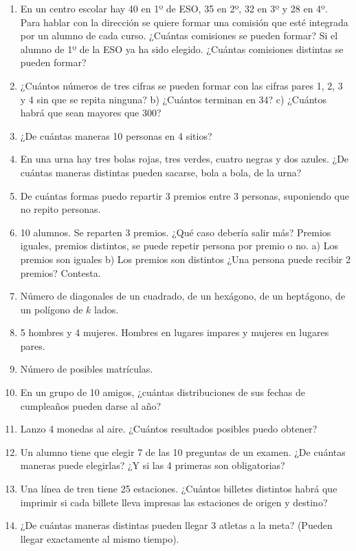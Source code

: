 \begin{enumerate}
	\item En un centro escolar hay 40 en 1º de ESO, 35 en 2º, 32 en 3º y 28 en 4º. Para hablar con la dirección se quiere formar una comisión que esté integrada por un alumno de cada curso. ¿Cuántas comisiones se pueden formar?
	\subitem Si el alumno de 1º de la ESO ya ha sido elegido. ¿Cuántas comisiones distintas se pueden formar?
	\item ¿Cuántos números de tres cifras se pueden formar con las cifras pares 1, 2, 3 y 4 sin que se repita ninguna? b) ¿Cuántos terminan en 34? c) ¿Cuántos habrá que sean mayores que 300?
	\item ¿De cuántas maneras 10 personas en 4 sitios?
	\item En una urna hay tres bolas rojas, tres verdes, cuatro negras y dos azules. ¿De cuántas maneras distintas pueden sacarse, bola a bola, de la urna?
	\item De cuántas formas puedo repartir 3 premios entre 3 personas, suponiendo que no repito personas.
	\item 10 alumnos. Se reparten 3 premios.
		\subitem ¿Qué caso debería salir más? Premios iguales, premios distintos, se puede repetir persona por premio o no.
		\subitem a) Los premios son iguales
		\subitem b) Los premios son distintos
		\subitem ¿Una persona puede recibir 2 premios? Contesta.
	\item Número de diagonales de un cuadrado, de un hexágono, de un heptágono, de un polígono de $k$ lados.
	\item 5 hombres y 4 mujeres. Hombres en lugares impares y mujeres en lugares pares.
	\item Número de posibles matrículas.
	\item En un grupo de 10 amigos, ¿cuántas distribuciones de sus fechas de cumpleaños pueden darse al año?
	\item Lanzo 4 monedas al aire. ¿Cuántos resultados posibles puedo obtener?
	\item Un alumno tiene que elegir 7 de las 10 preguntas de un examen. ¿De cuántas maneras puede elegirlas? ¿Y si las 4 primeras son obligatorias?
	\item Una línea de tren tiene 25 estaciones. ¿Cuántos billetes distintos habrá que imprimir si cada billete lleva impresas las estaciones de origen y destino?
	\item ¿De cuántas maneras distintas pueden llegar 3 atletas a la meta? (Pueden llegar exactamente al mismo tiempo).

\end{enumerate}
